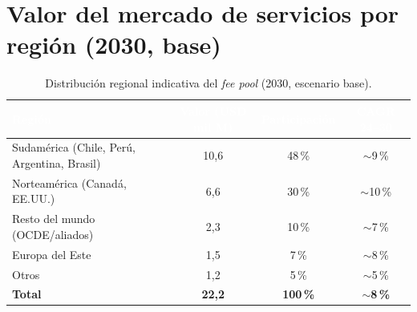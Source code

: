 \documentclass[11pt,letterpaper]{report}
\begin{document}
\begin{table}[htbp]
\centering
\caption{Madurez de la demanda de ingeniería, escala 1--5 ($5=$ mayor tracción).}
\label{tab:radar-madurez}
\scriptsize
\renewcommand{\arraystretch}{1.2}
\end{table}

\section{Valor del mercado de servicios por región (2030, base)}
\begin{table}[htbp]
\centering
\caption{Distribución regional indicativa del \emph{fee pool} (2030, escenario base).}
\label{tab:region}
\footnotesize
\renewcommand{\arraystretch}{1.25}
\begin{tabularx}{\textwidth}{@{}Xccc@{}}
\toprule
\rowcolor{tablehead}
\textcolor{white}{\textbf{Región}} & \textcolor{white}{\textbf{Valor (USD mil M)}} &
\textcolor{white}{\textbf{Participación}} & \textcolor{white}{\textbf{CAGR 24--30}}\\
\midrule
Sudamérica (Chile, Perú, Argentina, Brasil) & 10{,}6 & 48\,\% & $\sim$9\,\%\\
\rowcolor{tablealt}Norteamérica (Canadá, EE.UU.) & 6{,}6 & 30\,\% & $\sim$10\,\%\\
Resto del mundo (OCDE/aliados) & 2{,}3 & 10\,\% & $\sim$7\,\%\\
\rowcolor{tablealt}Europa del Este & 1{,}5 & 7\,\% & $\sim$8\,\%\\
Otros & 1{,}2 & 5\,\% & $\sim$5\,\%\\
\midrule
\textbf{Total} & \textbf{22{,}2} & \textbf{100\,\%} & \textbf{$\sim$8\,\%}\\
\bottomrule
\end{tabularx}
\end{table}
\end{document}
